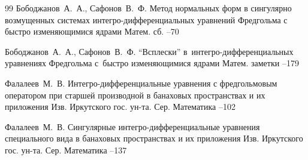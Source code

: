 {\begin{thebibliography}{99}
\by Бободжанов~А.~А., Сафонов~В.~Ф.
\paper Метод нормальных форм в сингулярно возмущенных системах интегро-дифференциальных уравнений Фредгольма с быстро изменяющимися ядрами
\jour Матем. сб.
--70

\by Бободжанов~А.~А., Сафонов~В.~Ф.
\paper ``Всплески'' в~интегро-дифференциальных уравнениях Фредгольма с~быстро изменяющимися ядрами
\jour Матем. заметки
--179

\by Фалалеев~М.~В.
\paper Интегро-дифференциальные уравнения с фредгольмовым оператором при старшей производной в банаховых пространствах и их приложения
\jour Изв. Иркутского гос. ун-та. Сер. Математика
--102

\by Фалалеев~М.~В.
\paper Сингулярные интегро-дифференциальные уравнения специального вида в банаховых пространствах и их приложения
\jour Изв. Иркутского гос. ун-та. Сер. Математика
--137


\end{thebibliography}}
